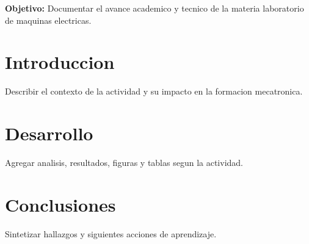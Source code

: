 \documentclass[spanish,letterpaper,oneside]{article}
\begin{document}
\templatePortrait
\templatePagecfg
\onehalfspacing

\begin{abstractd}
\textbf{Objetivo:} Documentar el avance academico y tecnico de la materia laboratorio de maquinas electricas.
\end{abstractd}

\templateIndex
\templateFinalcfg

\section{Introduccion}
Describir el contexto de la actividad y su impacto en la formacion mecatronica.

\section{Desarrollo}
Agregar analisis, resultados, figuras y tablas segun la actividad.

\section{Conclusiones}
Sintetizar hallazgos y siguientes acciones de aprendizaje.



\end{document}
